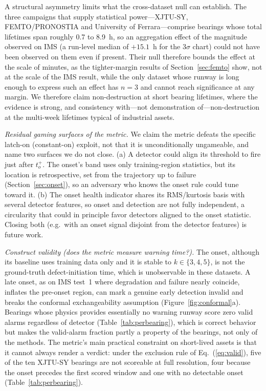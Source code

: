 \documentclass[IJPHM, 2026, 0]{PHMSociety}
\makeatletter
\def\PHMslashbreak{\kern\z@\discretionary{}{}{}}
\makeatother
\begin{document}
A structural asymmetry limits what the cross-dataset null can establish. The three campaigns that supply statistical power---XJTU-SY, FEMTO/\PHMslashbreak PRONOSTIA and University of Ferrara---comprise bearings whose total lifetimes span roughly 0.7 to 8.9~h, so an aggregation effect of the magnitude observed on IMS (a run-level median of $+15.1$~h for the $3\sigma$ chart) could not have been observed on them even if present. Their null therefore bounds the effect at the scale of minutes, as the tighter-margin results of Section~\ref{sec:femto} show, not at the scale of the IMS result, while the only dataset whose runway is long enough to express such an effect has $n=3$ and cannot reach significance at any margin. We therefore claim non-destruction at short bearing lifetimes, where the evidence is strong, and consistency with---not demonstration of---non-destruction at the multi-week lifetimes typical of industrial assets.

\emph{Residual gaming surfaces of the metric.} We claim the metric defeats the specific latch-on (constant-on) exploit, not that it is unconditionally ungameable, and name two surfaces we do not close. (a) A detector could align its threshold to fire just after $t_o^+$. The onset's band uses only training-region statistics, but its location is retrospective, set from the trajectory up to failure (Section~\ref{sec:onset}), so an adversary who knows the onset rule could tune toward it. (b) The onset health indicator shares its RMS/kurtosis basis with several detector features, so onset and detection are not fully independent, a circularity that could in principle favor detectors aligned to the onset statistic. Closing both (e.g.\ with an onset signal disjoint from the detector features) is future work.

\emph{Construct validity (does the metric measure warning time?).} The onset, although its baseline uses training data only and it is stable to $k \in \{3,4,5\}$, is not the ground-truth defect-initiation time, which is unobservable in these datasets. A late onset, as on IMS test~1 where degradation and failure nearly coincide, inflates the pre-onset region, can mark a genuine early detection invalid and breaks the conformal exchangeability assumption (Figure~\ref{fig:conformal}a). Bearings whose physics provides essentially no warning runway score zero valid alarms regardless of detector (Table~\ref{tab:perbearing}), which is correct behavior but makes the valid-alarm fraction partly a property of the bearings, not only of the methods. The metric's main practical constraint on short-lived assets is that it cannot always render a verdict: under the exclusion rule of Eq.~(\ref{eq:valid}), five of the ten XJTU-SY bearings are not scoreable at full resolution, four because the onset precedes the first scored window and one with no detectable onset (Table~\ref{tab:perbearing}).
\end{document}
